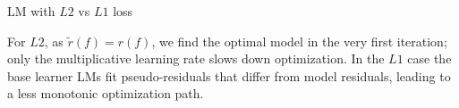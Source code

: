 \begin{frame}{LM with $L2$ vs $L1$ loss}

\vfill

\footnotesize
For $L2$, as $\tilde r(f) = r(f)$, we find the optimal model in the very
first iteration; only the multiplicative learning rate slows down optimization.
In the $L1$ case the base learner LMs fit pseudo-residuals that differ from
model residuals, leading to a less monotonic optimization path.

\end{frame}
%
%
%
%
%
%
%
%
%
%
%
%
%


